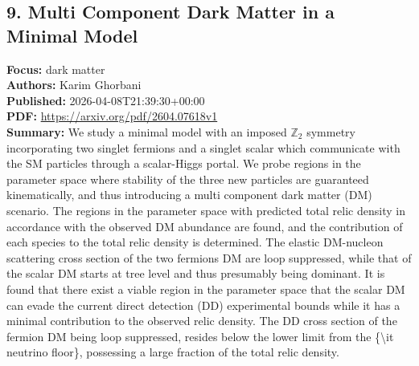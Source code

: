 \documentclass[11pt]{article}
\begin{document}
\subsection*{9. Multi Component Dark Matter in a Minimal Model}
\textbf{Focus:} dark matter\\
\textbf{Authors:} Karim Ghorbani\\
\textbf{Published:} 2026-04-08T21:39:30+00:00\\
\textbf{PDF:} \href{https://arxiv.org/pdf/2604.07618v1}{https://arxiv.org/pdf/2604.07618v1}\\
\textbf{Summary:}
We study a minimal model with an imposed $\mathbb{Z}_2$ symmetry incorporating two singlet fermions and a singlet scalar which communicate with the SM particles through a scalar-Higgs portal. We probe regions in the parameter space where stability of the three new particles are guaranteed kinematically, and thus introducing a multi component dark matter (DM) scenario. The regions in the parameter space with predicted total relic density in accordance with the observed DM abundance are found, and the contribution of each species to the total relic density is determined. The elastic DM-nucleon scattering cross section of the two fermions DM are loop suppressed, while that of the scalar DM starts at tree level and thus presumably being dominant. It is found that there exist a viable region in the parameter space that the scalar DM can evade the current direct detection (DD) experimental bounds while it has a minimal contribution to the observed relic density. The DD cross section of the fermion DM being loop suppressed, resides below the lower limit from the \{\textbackslash{}it neutrino floor\}, possessing a large fraction of the total relic density.
\newpage
\end{document}
